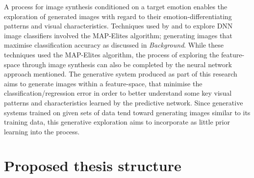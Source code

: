 \documentclass{article}
\begin{document}
A process for image synthesis conditioned on a target emotion enables the exploration of generated images with regard to their emotion-differentiating patterns and visual characteristics.
Techniques used by \citet{nguyen2015deep} and \citet{nguyen2015innovation} to explore DNN image classifiers involved the MAP-Elites algorithm; generating images that maximise classification accuracy as discussed in \textit{Background}.
While these techniques used the MAP-Elites algorithm, the process of exploring the feature-space through image synthesis can also be completed by the neural network approach mentioned.
The generative system produced as part of this research aims to generate images within a feature-space, that minimise the classification/regression error in order to better understand some key visual patterns and characteristics learned by the predictive network.
Since generative systems trained on given sets of data tend toward generating images similar to its training data, this generative exploration aims to incorporate as little prior learning into the process.

\pagebreak
\section{Proposed thesis structure}
\end{document}
